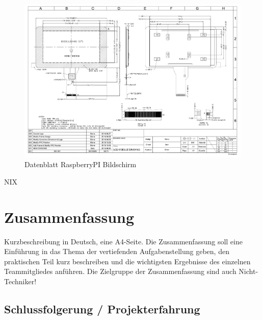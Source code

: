 \documentclass[12pt,a4paper]{article}
\newcommand{\yhbu}[0]{\color{ydkbu}}	%
\begin{document}
{\begin{figure}[H]
  \centering
		\includegraphics[scale=0.7, angle=90]{graphics/screen.pdf}
		\caption{Datenblatt RaspberryPI Bildschirm}
		\label{datasheet:raspiscreen}
\end{figure}




\clearpage\vfill\newpage
	\vfill
	{\color{white} NIX}




\clearpage\vfill\newpage
\section{\sc Zusammenfassung}
	{\yhbu
	Kurzbeschreibung in Deutsch, eine A4-Seite.
	Die Zusammenfassung soll eine Einführung in das Thema
	der vertiefenden Aufgabenstellung geben,
	den praktischen Teil kurz beschreiben und die wichtigsten Ergebnisse
	des einzelnen Teammitgliedes anführen.
	Die Zielgruppe der Zusammenfassung sind auch Nicht-Techniker!
	}

 \subsection{Schlussfolgerung / Projekterfahrung}

}
\end{document}
